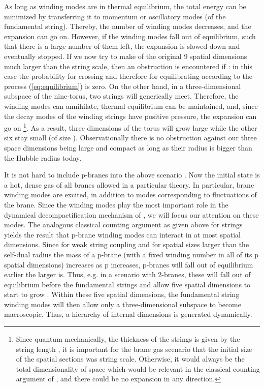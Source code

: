 \documentclass[a4paper,twocolumn,nofootinbib,tightenlines,prd,aps,
               superscriptaddress]{revtex4} %
\providecommand{\al}{\alpha}
\begin{document}
As long as winding modes are in thermal equilibrium, the total
energy can be minimized  by transferring it to momentum or
oscillatory  modes (of the fundamental string). Thereby, the
number of winding modes decreases, and the expansion can go on.
However, if the winding modes fall out of equilibrium, such that
there is a large number of them left, the expansion is slowed down
and eventually stopped. If we now try to make \coordHE{} of the original
9 spatial dimensions much larger than the string scale, then an
obstruction is encountered if \coordHE{}: in this case the
probability for crossing and therefore for equilibrating according
to the process (\ref{eq:equilibrium}) is zero. On the other hand,
in a three-dimensional subspace of the nine-torus, two strings
will generically meet. Therefore, the winding modes can
annihilate, thermal equilibrium can be maintained, and, since the
decay modes of the winding strings have positive pressure, the
expansion can go on \footnote{Since quantum mechanically, the
thickness of the strings is given by the string length
\cite{Karliner:1988hd}, it is important for the brane gas scenario
that the initial size of the spatial sections was string scale.
Otherwise, it would always be the total dimensionality of space
which would be relevant in the classical counting argument of
\cite{Brandenberger:1989aj}, and there could be no expansion in
any direction.}. As a result, three dimensions of the torus will
grow large while the other six stay small (of size \myHighlight{$R \sim
\al^{'1/2}$}\coordHE{}).  Observationally there is no obstruction against
our three space dimensions being
large and compact as long as their radius is bigger than
the Hubble radius today.

It is not hard to include p-branes into the above scenario
\cite{Alexander:2000xv}. Now the initial state is a hot, dense gas
of all branes allowed in a particular theory. In particular, brane
winding modes are excited, in addition to modes corresponding to
fluctuations of the brane. Since the winding modes play the most
important role in the dynamical decompactification mechanism of
\cite{Brandenberger:1989aj,Alexander:2000xv}, we will focus our
attention on these modes. The analogous classical counting
argument as given above for strings yields the result that p-brane
winding modes can interact in at most \coordHE{} spatial dimensions.
Since for weak string coupling and for spatial sizes larger than
the self-dual radius the mass of a p-brane (with a fixed winding
number in all of its p spatial dimensions) increases as p
increases, p-branes will fall out of equilibrium earlier the
larger \coordHE{} is. Thus, e.g. in a scenario with 2-branes, these will
fall out of equilibrium before the fundamental strings and allow
five spatial dimensions to start to grow \cite{Alexander:2000xv}.
Within these five spatial dimensions, the fundamental string
winding modes will then allow only a three-dimensional subspace to
become macroscopic. Thus, a hierarchy of internal dimensions is
generated dynamically.
\end{document}
